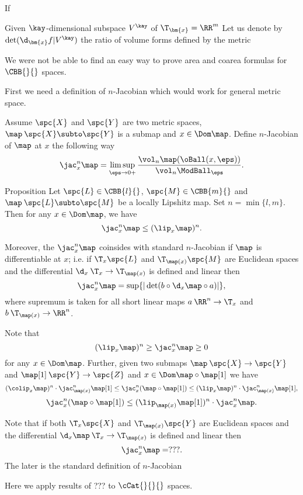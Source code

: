 If 

Given $\kay$-dimensional subspace $V^\kay$ of $\T_{\bm{x}}=\RR^m$
Let us denote  by $\det(\d_{\bm{x}}f|V^\kay)$ the ratio of volume forms defined by the metric 




We were not be able to find an easy way to prove area and coarea formulas for $\CBB{}{}$ spaces.


First we need a definition of $n$-Jacobian which would work for general metric space.

Assume $\spc{X}$ and $\spc{Y}$ are two metric spaces,
$\map\:\spc{X}\subto\spc{Y}$ is a submap 
and $x\in\Dom\map$.
Define $n$-Jacobian of $\map$ at $x$ the following way
$$\jac^n_x\map
=
\limsup_{\eps\to0+}\frac{\vol_n \map(\oBall(x,\eps))}{\vol_n\ModBall_\eps}.$$

\begin{thm}{Proposition}
Let $\spc{L}\in \CBB{l}{}$,
$\spc{M}\in\CBB{m}{}$ 
and $\map\:\spc{L}\subto\spc{M}$ be a locally Lipshitz map.
Set $n=\min\{l,m\}$.
Then for any $x\in\Dom\map$,
we have
$$\jac^n_x\map\le(\lip_x\map)^n.$$

Moreover, the $\jac^n_x\map$ coinsides with standard $n$-Jacobian if $\map$ is differentiable at $x$;
i.e. if $\T_x\spc{L}$ and $\T_{\map(x)}\spc{M}$ are Euclidean spaces
and the differential $\d_x\:\T_x\to\T_{\map(x)}$ is defined and linear then
$$\jac^n_x\map
=
\sup\{|\det(b\circ\d_x\map\circ a)|\},$$
where supremum is taken for all short linear maps $a\:\RR^n\to \T_x$ and $b\:\T_{\map(x)}\to \RR^n$.
\end{thm}


Note that 
$$(\lip_x\map)^n\ge\jac^n_x\map\ge 0$$ 
for any $x\in\Dom\map$.
Further, given two submaps $\map\:\spc{X}\to\spc{Y}$ and $\map[1]\:\spc{Y}\to\spc{Z}$ and $x\in\Dom\map\circ\map[1]$ we have
$$(\colip_x\map)^n\cdot\jac^n_{\map(x)}\map[1]\le\jac^n_x(\map\circ\map[1])\le (\lip_x\map)^n\cdot\jac^n_{\map(x)}\map[1],$$
$$\jac^n_x(\map\circ\map[1])\le (\lip_{\map(x)}\map[1])^n\cdot\jac^n_{x}\map.$$

Note that if both $\T_x\spc{X}$ and $\T_{\map(x)}\spc{Y}$ are Euclidean spaces and the differential $\d_x\map\:\T_x\to\T_{\map(x)}$ is defined and linear then 
$$\jac^n_x\map
=
???.$$
The later is the standard definition of $n$-Jacobian








Here we apply results of ??? to $\cCat{}{}{}$ spaces.

